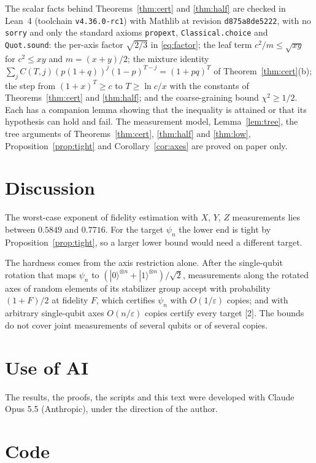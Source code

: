 \documentclass[11pt]{article}
\theoremstyle{remark}
\newcommand{\eps}{\varepsilon}
\newcommand{\ket}[1]{|#1\rangle}
\begin{document}
The scalar facts behind Theorems~\ref{thm:cert} and \ref{thm:half} are checked in Lean~4 (toolchain \texttt{v4.36.0-rc1}) with Mathlib at revision \texttt{d875a8de5222}, with no \texttt{sorry} and only the standard axioms \texttt{propext}, \texttt{Classical.choice} and \texttt{Quot.sound}: the per-axis factor $\sqrt{2/3}$ in \eqref{eq:factor}; the leaf term $c^2/m\le\sqrt{xy}$ for $c^2\le xy$ and $m = (x+y)/2$; the mixture identity $\sum_jC(T,j)(p(1+q))^j(1-p)^{T-j} = (1+pq)^T$ of Theorem~\ref{thm:cert}(b); the step from $(1+x)^T\ge c$ to $T\ge\ln c/x$ with the constants of Theorems~\ref{thm:cert} and \ref{thm:half}; and the coarse-graining bound $\chi^2\ge1/2$. Each has a companion lemma showing that the inequality is attained or that its hypothesis can hold and fail. The measurement model, Lemma~\ref{lem:tree}, the tree arguments of Theorems~\ref{thm:cert}, \ref{thm:half} and \ref{thm:low}, Proposition~\ref{prop:tight} and Corollary~\ref{cor:axes} are proved on paper only.

\section{Discussion}\label{sec:disc}

The worst-case exponent of fidelity estimation with $X$, $Y$, $Z$ measurements lies between $0.5849$ and $0.7716$. For the target $\psi_n$ the lower end is tight by Proposition~\ref{prop:tight}, so a larger lower bound would need a different target.

The hardness comes from the axis restriction alone. After the single-qubit rotation that maps $\psi_n$ to $(\ket0^{\otimes n}+\ket1^{\otimes n})/\sqrt2$, measurements along the rotated axes of random elements of its stabilizer group accept with probability $(1+F)/2$ at fidelity $F$, which certifies $\psi_n$ with $O(1/\eps)$ copies; and with arbitrary single-qubit axes $O(n/\eps)$ copies certify every target [2]. The bounds do not cover joint measurements of several qubits or of several copies.

\section*{Use of AI}

The results, the proofs, the scripts and this text were developed with Claude Opus 5.5 (Anthropic), under the direction of the author.

\section*{Code}
\end{document}
